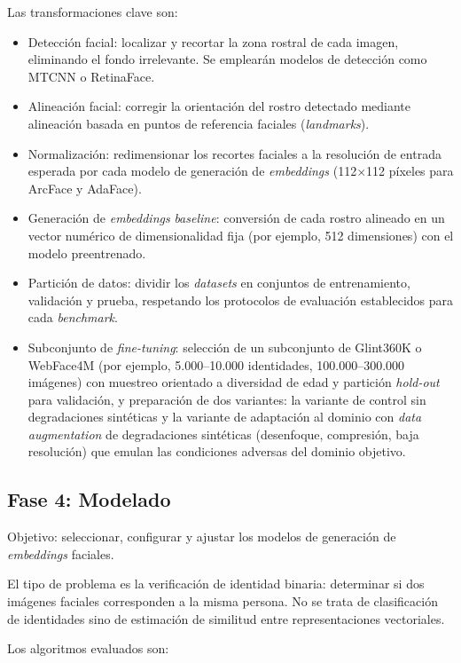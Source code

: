 \documentclass[
  11pt, %
]{charter}
\begin{document}
Las transformaciones clave son:

\begin{itemize}
  \item Detección facial: localizar y recortar la zona rostral de cada imagen, eliminando el fondo irrelevante. Se emplearán modelos de detección como MTCNN o RetinaFace.
  \item Alineación facial: corregir la orientación del rostro detectado mediante alineación basada en puntos de referencia faciales (\textit{landmarks}).
  \item Normalización: redimensionar los recortes faciales a la resolución de entrada esperada por cada modelo de generación de \textit{embeddings} (112$\times$112 píxeles para ArcFace y AdaFace).
  \item Generación de \textit{embeddings} \textit{baseline}: conversión de cada rostro alineado en un vector numérico de dimensionalidad fija (por ejemplo, 512 dimensiones) con el modelo preentrenado.
  \item Partición de datos: dividir los \textit{datasets} en conjuntos de entrenamiento, validación y prueba, respetando los protocolos de evaluación establecidos para cada \textit{benchmark}.
  \item Subconjunto de \textit{fine-tuning}: selección de un subconjunto de Glint360K o WebFace4M (por ejemplo, 5.000--10.000 identidades, 100.000--300.000 imágenes) con muestreo orientado a diversidad de edad y partición \textit{hold-out} para validación, y preparación de dos variantes: la variante de control sin degradaciones sintéticas y la variante de adaptación al dominio con \textit{data augmentation} de degradaciones sintéticas (desenfoque, compresión, baja resolución) que emulan las condiciones adversas del dominio objetivo.
\end{itemize}

\subsection{Fase 4: Modelado}

Objetivo: seleccionar, configurar y ajustar los modelos de generación de \textit{embeddings} faciales.

El tipo de problema es la verificación de identidad binaria: determinar si dos imágenes faciales corresponden a la misma persona. No se trata de clasificación de identidades sino de estimación de similitud entre representaciones vectoriales.

Los algoritmos evaluados son:
\end{document}
